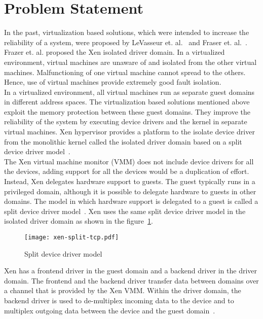 \section {Problem Statement}
\label{sec:problem}
In the past, virtualization based solutions, which were intended to increase the reliability of a system, were proposed by LeVasseur et. al.~\cite{LeVasseur04UnmodifiedDriverReuse} and Fraser et. al.~\cite{Fraser04safehardware}. Frazer et. al. proposed the Xen isolated driver domain. In a virtualized environment, virtual machines are unaware of and isolated from the other virtual machines. Malfunctioning of one virtual machine cannot spread to the others. Hence, use of virtual machines provide extremely good fault isolation. 
\\[3mm]
In a virtualized environment, all virtual machines run as separate guest domains in different address spaces. The virtualization based solutions mentioned above exploit the memory protection between these guest domains. They improve the reliability of the system by executing device drivers and the kernel in separate virtual machines. Xen hypervisor provides a platform to the isolate device driver from the monolithic kernel called the isolated driver domain based on a split device driver model~\cite{driverdomain}.
\\[3mm]
The Xen virtual machine monitor (VMM) does not include device drivers for all the devices, adding support for all the devices would be a duplication of effort. Instead, Xen delegates hardware support to guests. The guest typically runs in a privileged domain, although it is possible to delegate hardware to guests in other domains. The model in which hardware support is delegated to a guest is called a split device driver model~\cite{Chisnall:2007:DGX:1407351}. Xen uses the same split device driver model in the isolated driver domain as shown in the figure~\ref{fig:xen-split}.
\begin{figure}[!ht]
\centering
\texttt{[image: xen-split-tcp.pdf]}
\caption{Split device driver model}
\label{fig:xen-split}
\end{figure}
Xen has a frontend driver in the guest domain and a backend driver in the driver domain. The frontend and the backend driver transfer data between domains over a channel that is provided by the Xen VMM. Within the driver domain, the backend driver is used to de-multiplex incoming data to the device and to multiplex outgoing data between the device and the guest domain~\cite{driverdomain}.
\\[3mm]

